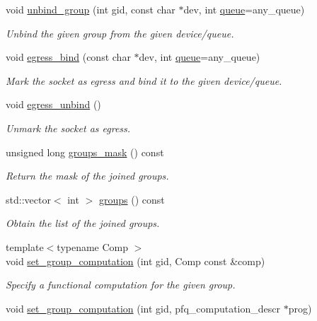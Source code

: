\begin{DoxyCompactItemize}
void \hyperlink{classpfq_1_1socket_a6e1f7ee7f44b6824d734d4ff7046d907}{unbind\+\_\+group} (int gid, const char $\ast$dev, int \hyperlink{classpfq_1_1queue}{queue}=any\+\_\+queue)
\begin{DoxyCompactList}\small\item\em Unbind the given group from the given device/queue. \end{DoxyCompactList}\item 
void \hyperlink{classpfq_1_1socket_a2c96741054ea764f5d8c31295ef5df29}{egress\+\_\+bind} (const char $\ast$dev, int \hyperlink{classpfq_1_1queue}{queue}=any\+\_\+queue)
\begin{DoxyCompactList}\small\item\em Mark the socket as egress and bind it to the given device/queue. \end{DoxyCompactList}\item 
void \hyperlink{classpfq_1_1socket_ae80718e8f26cdaed3fd05bfde6d835e0}{egress\+\_\+unbind} ()
\begin{DoxyCompactList}\small\item\em Unmark the socket as egress. \end{DoxyCompactList}\item 
unsigned long \hyperlink{classpfq_1_1socket_a45c12f4255af4eb74bb9a75d8e1a56eb}{groups\+\_\+mask} () const 
\begin{DoxyCompactList}\small\item\em Return the mask of the joined groups. \end{DoxyCompactList}\item 
std\+::vector$<$ int $>$ \hyperlink{classpfq_1_1socket_a7bb02f670cf9c16b4339f650c7b80de7}{groups} () const 
\begin{DoxyCompactList}\small\item\em Obtain the list of the joined groups. \end{DoxyCompactList}\item 
{\footnotesize template$<$typename Comp $>$ }\\void \hyperlink{classpfq_1_1socket_a5cb37765ffcb1b78c5d61211f9e806df}{set\+\_\+group\+\_\+computation} (int gid, Comp const \&comp)
\begin{DoxyCompactList}\small\item\em Specify a functional computation for the given group. \end{DoxyCompactList}\item 
void \hyperlink{classpfq_1_1socket_acd2ef781a82b49566f03a085ba091138}{set\+\_\+group\+\_\+computation} (int gid, pfq\+\_\+computation\+\_\+descr $\ast$prog)

\end{DoxyCompactItemize}

